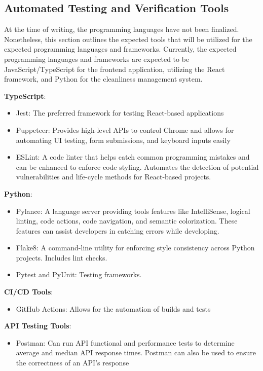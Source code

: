 \documentclass[12pt, titlepage]{article}
\begin{document}
\subsection{Automated Testing and Verification Tools}
\label{subsec:tools}
At the time of writing, the programming languages have not been finalized. Nonetheless, this section outlines the expected tools that will be utilized for the expected programming languages and frameworks. Currently, the expected programming languages and frameworks are expected to be JavaScript/TypeScript for the frontend application, utilizing the React framework, and Python for the cleanliness management system.
  
  \textbf{TypeScript}:
   \begin{itemize}
   \item Jest: The preferred framework for testing React-based applications
   \item Puppeteer: Provides high-level APIs to control Chrome and allows for automating UI testing, form submissions, and keyboard inputs easily
   \item ESLint: A code linter that helps catch common programming mistakes and can be enhanced to enforce code styling. Automates the detection of potential vulnerabilities and life-cycle methods for React-based projects.
   \end{itemize}
   \textbf{Python}:
   \begin{itemize}
   \item Pylance: A language server providing tools features like IntelliSense, logical linting, code actions, code navigation, and semantic colorization. These features can assist developers in catching errors while developing.
   \item Flake8: A command-line utility for enforcing style consistency across Python projects. Includes lint checks.
   \item Pytest and PyUnit: Testing frameworks.
   \end{itemize}
  \textbf{CI/CD Tools}:
  \begin{itemize}
  \item GitHub Actions: Allows for the automation of builds and tests
  \end{itemize}
    \textbf{API Testing Tools}:
  \begin{itemize}
  \item Postman: Can run API functional and performance tests to determine average and median API response times. Postman can also be used to ensure the correctness of an API's response 
  \end{itemize}
\end{document}
